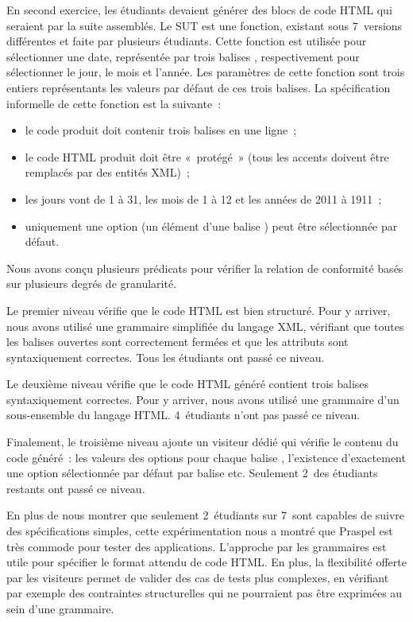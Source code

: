 En second exercice, les étudiants devaient générer des blocs de code HTML qui
seraient par la suite assemblés. Le SUT est une fonction, existant sous
7~versions différentes et faite par plusieurs étudiants. Cette fonction est
utilisée pour sélectionner une date, représentée par trois balises
, respectivement pour sélectionner le jour, le mois et l'année. Les
paramètres de cette fonction sont trois entiers représentants les valeurs par
défaut de ces trois balises. La spécification informelle de cette fonction est
la suivante~:
%
\begin{itemize}

\item le code produit doit contenir trois balises  en une ligne~;

\item le code HTML produit doit être «~protégé~» (tous les accents doivent être
remplacés par des entités XML)~;

\item les jours vont de 1 à 31, les mois de 1 à 12 et les années de 2011 à
1911~;

\item uniquement une option (un élément d'une balise ) peut être
sélectionnée par défaut.

\end{itemize}
%
Nous avons conçu plusieurs prédicats pour vérifier la relation de conformité
basés sur plusieurs degrés de granularité.

Le premier niveau vérifie que le code HTML est bien structuré. Pour y arriver,
nous avons utilisé une grammaire simplifiée du langage XML, vérifiant que toutes
les balises ouvertes sont correctement fermées et que les attributs sont
syntaxiquement correctes. Tous les étudiants ont passé ce niveau.

Le deuxième niveau vérifie que le code HTML généré contient trois balises
 syntaxiquement correctes. Pour y arriver, nous avons utilisé une
grammaire d'un sous-ensemble du langage HTML. 4~étudiants n'ont pas passé ce
niveau.

Finalement, le troisième niveau ajoute un visiteur dédié qui vérifie le contenu
du code généré~: les valeurs des options pour chaque balise ,
l'existence d'exactement une option sélectionnée par défaut par balise etc.
Seulement 2~des étudiants restants ont passé ce niveau.

En plus de nous montrer que seulement 2~étudiants sur 7~sont capables de suivre
des spécifications simples, cette expérimentation nous a montré que Praspel est
très commode pour tester des applications. L'approche par les grammaires est
utile pour spécifier le format attendu de code HTML. En plus, la flexibilité
offerte par les visiteurs permet de valider des cas de tests plus complexes, en
vérifiant par exemple des contraintes structurelles qui ne pourraient pas être
exprimées au sein d'une grammaire.
